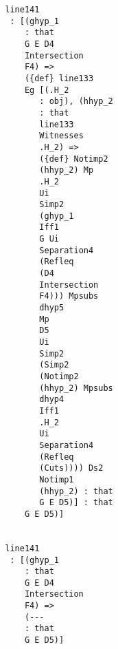 \documentclass[12pt]{article}
\begin{document}
\begin{verbatim}
                                 line141 
                                  : [(ghyp_1 
                                     : that 
                                     G E D4 
                                     Intersection 
                                     F4) => 
                                     ({def} line133 
                                     Eg [(.H_2 
                                        : obj), (hhyp_2 
                                        : that 
                                        line133 
                                        Witnesses 
                                        .H_2) => 
                                        ({def} Notimp2 
                                        (hhyp_2) Mp 
                                        .H_2 
                                        Ui 
                                        Simp2 
                                        (ghyp_1 
                                        Iff1 
                                        G Ui 
                                        Separation4 
                                        (Refleq 
                                        (D4 
                                        Intersection 
                                        F4))) Mpsubs 
                                        dhyp5 
                                        Mp 
                                        D5 
                                        Ui 
                                        Simp2 
                                        (Simp2 
                                        (Notimp2 
                                        (hhyp_2) Mpsubs 
                                        dhyp4 
                                        Iff1 
                                        .H_2 
                                        Ui 
                                        Separation4 
                                        (Refleq 
                                        (Cuts)))) Ds2 
                                        Notimp1 
                                        (hhyp_2) : that 
                                        G E D5)] : that 
                                     G E D5)]


                                 line141 
                                  : [(ghyp_1 
                                     : that 
                                     G E D4 
                                     Intersection 
                                     F4) => 
                                     (--- 
                                     : that 
                                     G E D5)]



\end{verbatim}
\end{document}
